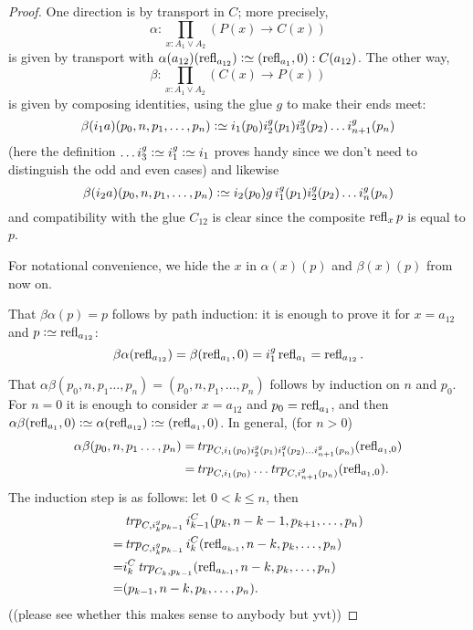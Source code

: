 \begin{proof}
One direction is by transport in $C$; more precisely, 
$$\alpha:\prod_{x:A_1\vee A_2}(P(x)\to C(x))$$ is given by transport with $\alpha(a_{12})(\refl{a_{12}})\defequi(\refl{a_{1}},0):C(a_{12})$.  %
The other way, 
$$\beta:\prod_{x:A_1\vee A_2}(C(x)\to P(x))$$ is given by composing identities, using the glue $g$ to make their ends meet: 
$$\beta(i_1a)(p_0,n,p_1,\dots,p_n)\defequi i_1(p_0)i_2^g(p_1)i_3^g(p_2) \dots i_{n+1}^g(p_n)$$ 
(here the definition $\dots i_3^g\defequi i_1^g\defequi i_1$ proves handy since we don't need to distinguish the odd and even cases)  %
and likewise 
$$\beta(i_2a)(p_0,n,p_1,\dots,p_n)\defequi i_2(p_0)g\,i_1^g(p_1)i_2^g(p_2) \dots i_{n}^g(p_n)$$ and compatibility with the glue $C_{12}$ is clear since the composite $\refl{x}p$ is equal to $p$.

For notational convenience, we hide the $x$ in $\alpha(x)(p)$ and $\beta(x)(p)$ from now on.

That $\beta\alpha(p)=p$ follows by path induction: it is enough to prove it for $x=a_{12}$ and
$p\defequi\refl{a_{12}}$:
$$\beta\alpha(\refl{a_{12}})=\beta(\refl{a_1},0)=i_1^g\refl{a_1}=\refl{a_{12}}.$$  

That $\alpha\beta(p_0,n,p_1\dots,p_n)=(p_0,n,p_1,\dots,p_n)$ follows by induction on $n$ and $p_0$.  For $n=0$ it is enough to consider  $x=a_{12}$ and $p_0=\refl{a_1}$, and then 
$\alpha\beta(\refl{a_1},0)\defequi\alpha(\refl{a_{12}})\defequi(\refl{a_1},0)$.  In general, (for $n>0$) 
\begin{align*}
  \alpha\beta(p_0,n,p_1\dots,p_n)
=&\trp[C]{i_1(p_0)i_2^g(p_1)i_1^g(p_2) \dots i_{n+1}^g(p_n)}(\refl{a_1,0})\\
=&\trp[C]{i_1(p_0)}\dots\trp[C]{i_{n+1}^g(p_n)}(\refl{a_1,0}).
\end{align*}
  The induction step is as follows: let $0< k\leq n$, then 
\begin{align*}
  &\trp[C]{i_k^gp_{k-1}}i^C_{k-1}(p_k,n-k-1,p_{k+1},\dots,p_n)\\
  =&\trp[C]{i_k^gp_{k-1}}i^C_k(\refl{a_{k-1}},n-k,p_k,\dots,p_n)\\
  =&i^C_k\trp[C_k]{p_{k-1}}(\refl{a_{k-1}},n-k,p_k,\dots,p_n)\\
  =&(p_{k-1},n-k,p_k,\dots,p_n).
\end{align*}
((please see whether this makes sense to anybody but yvt))
\end{proof}

